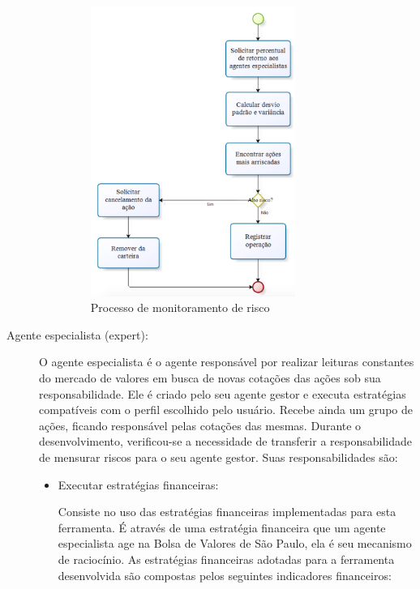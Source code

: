 \begin{description}
\begin{itemize}
\begin{figure}[H]
\centering
\label{f24}
\includegraphics[width=0.7\textwidth]{figuras/f15}
\caption{Processo de monitoramento de risco}
\end{figure}
\FloatBarrier

\end{itemize}

\item[Agente especialista (expert):]
O agente especialista é o agente responsável por realizar leituras constantes do mercado de valores em busca de novas cotações das ações sob sua responsabilidade. Ele é criado pelo seu agente gestor e executa estratégias compatíveis com o perfil escolhido pelo usuário. Recebe ainda um grupo de ações, ficando responsável pelas cotações das mesmas. Durante o desenvolvimento, verificou-se a necessidade de transferir a responsabilidade de mensurar riscos para o seu agente gestor. Suas responsabilidades são:

\begin{itemize}
\item Executar estratégias financeiras:\newline

Consiste no uso das estratégias financeiras implementadas para esta ferramenta. É através de uma estratégia financeira que um agente especialista age na Bolsa de Valores de São Paulo, ela é seu mecanismo de raciocínio. As estratégias financeiras adotadas para a ferramenta desenvolvida são compostas pelos seguintes indicadores financeiros: 


\end{itemize}
\end{description}

